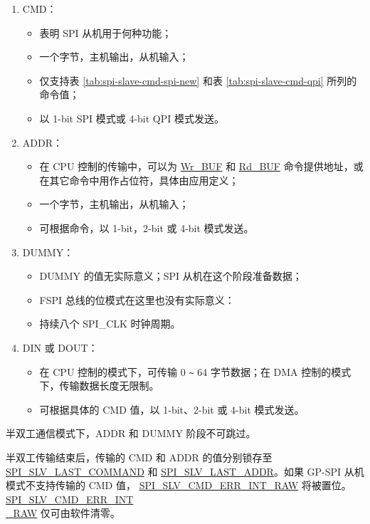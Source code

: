 \documentclass[main\_\_CN.tex]{subfiles}
\begin{document}
\begin{enumerate}
   \item CMD：
        \begin{itemize}
            \item 表明 SPI 从机用于何种功能；
            \item 一个字节，主机输出，从机输入；
            \item 仅支持表  \ref{tab:spi-slave-cmd-spi-new} 和表  \ref{tab:spi-slave-cmd-qpi} 所列的命令值；
            \item 以 1-bit SPI 模式或 4-bit QPI 模式发送。
        \end{itemize}

   \item ADDR：
        \begin{itemize}
            \item 在 CPU 控制的传输中，可以为  \hyperlink{cmd:wrbuf}{Wr\_BUF} 和 \hyperlink{cmd:rdbuf}{Rd\_BUF} 命令提供地址，或在其它命令中用作占位符，具体由应用定义；
            \item 一个字节，主机输出，从机输入；
            \item 可根据命令，以 1-bit，2-bit 或 4-bit 模式发送。
        \end{itemize}

   \item DUMMY：
        \begin{itemize}
            \item DUMMY 的值无实际意义；SPI 从机在这个阶段准备数据；
            \item FSPI 总线的位模式在这里也没有实际意义：
            \item 持续八个 SPI\_CLK 时钟周期。
        \end{itemize}

   \item DIN 或 DOUT：

        \begin{itemize}
            \item 在 CPU 控制的模式下，可传输 0 \verb+~+ 64 字节数据；在 DMA 控制的模式下，传输数据长度无限制。
            \item 可根据具体的 CMD 值，以 1-bit、2-bit 或 4-bit 模式发送。
        \end{itemize}

   \end{enumerate}

\begin{tiplisting}
半双工通信模式下，ADDR 和 DUMMY 阶段不可跳过。
\end{tiplisting}
\vspace{-1em}
半双工传输结束后，传输的 CMD 和 ADDR 的值分别锁存至  \hyperref[fielddesc:SPISLVLASTCOMMAND]{SPI\_SLV\_LAST\_COMMAND} 和 \hyperref[fielddesc:SPISLVLASTADDR]{SPI\_SLV\_LAST\_ADDR}。如果 GP-SPI 从机模式不支持传输的 CMD 值， \hyperref[fielddesc:SPISLVCMDERRINTRAW]{SPI\_SLV\_CMD\_ERR\_INT\_RAW} 将被置位。 \hyperref[fielddesc:SPISLVCMDERRINTRAW]{SPI\_SLV\_CMD\_ERR\_INT\\\_RAW} 仅可由软件清零。
\end{document}
